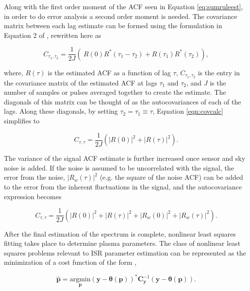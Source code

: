Along with the first order moment of the ACF seen in Equation \ref{eq:sumruleest}, in order to do error analysis a second order moment is needed. The covariance matrix between each lag estimate can be formed using the formulation in Equation 2 of \cite{hysell2008}, rewritten here as

\begin{equation}
\label{eqn:covcalc}
C_{\tau_1,\tau_2} = \frac{1}{2J} \left( \ R(0)  R^*(\tau_1-\tau_2) +  R(\tau_1) R^*(\tau_2) \right),
\end{equation}

\noindent where, $R(\tau)$ is the estimated ACF as a function of lag $\tau$, $C_{\tau_1,\tau_2}$ is the entry in the covariance matrix of the estimated ACF at lags $\tau_1$ and $\tau_2$,  and $J$ is the number of samples or pulses averaged together to create the estimate. The diagonals of this matrix can be thought of as the autocovariances of each of the lags.  Along these diagonals, by setting $\tau_2 = \tau_1 \equiv \tau$, Equation \ref{eqn:covcalc} simplifies to

\begin{equation}
\label{eqn:covdiag}
C_{\tau,\tau} = \frac{1}{2J} \left(  |R(0)|^2 +|R(\tau)|^2\right).
\end{equation}

The variance of the signal ACF estimate is further increased once sensor and sky noise is added.  If the noise is assumed to be uncorrelated with the signal, the error from the noise, $\left|R_w (\tau)\right|^2$ (e.g. the square of the noise ACF) can be added to the error from the inherent fluctuations in the signal, and the autocovariance expression becomes

\begin{equation}
\label{eqn:covdiagwn}
C_{\tau,\tau} = \frac{1}{2J} \left(  |R(0)|^2 +|R(\tau)|^2 + \left|R_w (0)\right|^2+\left|R_w (\tau)\right|^2\right).
\end{equation}


After the final estimation of the spectrum is complete, nonlinear least squares fitting takes place to determine plasma parameters.  
The class of nonlinear least squares problems relevant to ISR parameter estimation can be represented as the minimization of a cost function of the form \cite{kayvol1},

\begin{equation}
	\mathbf{\hat{p}}= \underset{\mathbf{p}}{\text{argmin}} (\mathbf{y}-\bm{\theta}(\mathbf{p}))^*\mathbf{C}_{\mathbf{y}}^{-1}(\mathbf{y}-\bm{\theta}(\mathbf{p})).
\label{nlls}
\end{equation}

